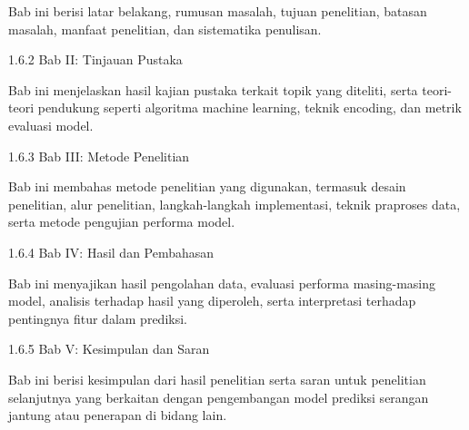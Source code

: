     Bab ini berisi latar belakang, rumusan masalah, tujuan penelitian, batasan masalah, manfaat penelitian, dan sistematika penulisan.
    
    1.6.2 Bab II: Tinjauan Pustaka

    Bab ini menjelaskan hasil kajian pustaka terkait topik yang diteliti, serta teori-teori pendukung seperti algoritma machine learning, teknik encoding, dan metrik evaluasi model.

    1.6.3 Bab III: Metode Penelitian

    Bab ini membahas metode penelitian yang digunakan, termasuk desain penelitian, alur penelitian, langkah-langkah implementasi, teknik praproses data, serta metode pengujian performa model.

    1.6.4 Bab IV: Hasil dan Pembahasan

    Bab ini menyajikan hasil pengolahan data, evaluasi performa masing-masing model, analisis terhadap hasil yang diperoleh, serta interpretasi terhadap pentingnya fitur dalam prediksi.

    1.6.5 Bab V: Kesimpulan dan Saran

    Bab ini berisi kesimpulan dari hasil penelitian serta saran untuk penelitian selanjutnya yang berkaitan dengan pengembangan model prediksi serangan jantung atau penerapan di bidang lain.
